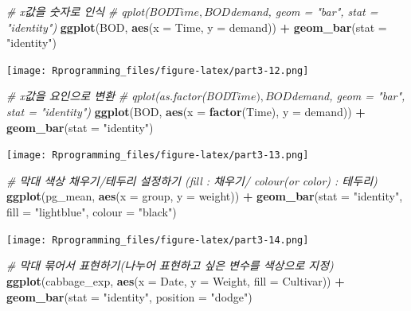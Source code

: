 \documentclass[10pt,]{krantz}
\makeatletter
\newenvironment{Shaded}{\begin{snugshade}}{\end{snugshade}}
\newcommand{\KeywordTok}[1]{\textcolor[rgb]{0.13,0.29,0.53}{\textbf{#1}}}
\newcommand{\DataTypeTok}[1]{\textcolor[rgb]{0.13,0.29,0.53}{#1}}
\newcommand{\StringTok}[1]{\textcolor[rgb]{0.31,0.60,0.02}{#1}}
\newcommand{\CommentTok}[1]{\textcolor[rgb]{0.56,0.35,0.01}{\textit{#1}}}
\newcommand{\OperatorTok}[1]{\textcolor[rgb]{0.81,0.36,0.00}{\textbf{#1}}}
\newcommand{\NormalTok}[1]{#1}
\newenvironment{kframe}{%
\medskip{}
\setlength{\fboxsep}{.8em}
 \def\at@end@of@kframe{}%
 \ifinner\ifhmode%
  \def\at@end@of@kframe{\end{minipage}}%
  \begin{minipage}{\columnwidth}%
 \fi\fi%
 \def\FrameCommand##1{\hskip\@totalleftmargin \hskip-\fboxsep
 \colorbox{shadecolor}{##1}\hskip-\fboxsep
     \hskip-\linewidth \hskip-\@totalleftmargin \hskip\columnwidth}%
 \MakeFramed {\advance\hsize-\width
   \@totalleftmargin\z@ \linewidth\hsize
   \@setminipage}}%
 {\par\unskip\endMakeFramed%
 \at@end@of@kframe}
\renewenvironment{Shaded}{\begin{kframe}}{\end{kframe}}
\theoremstyle{definition}
\theoremstyle{definition}
\theoremstyle{remark}
\makeatother
\begin{document}
\begin{Shaded}
\begin{Highlighting}[]


\CommentTok{# x값을 숫자로 인식}
\CommentTok{# qplot(BOD$Time, BOD$demand, geom = "bar", stat = "identity")}
\KeywordTok{ggplot}\NormalTok{(BOD, }\KeywordTok{aes}\NormalTok{(}\DataTypeTok{x =}\NormalTok{ Time, }\DataTypeTok{y =}\NormalTok{ demand)) }\OperatorTok{+}\StringTok{ }\KeywordTok{geom_bar}\NormalTok{(}\DataTypeTok{stat =} \StringTok{"identity"}\NormalTok{)}
\end{Highlighting}
\end{Shaded}

\texttt{[image: Rprogramming\_files/figure-latex/part3-12.png]}

\begin{Shaded}
\begin{Highlighting}[]


\CommentTok{# x값을 요인으로 변환}
\CommentTok{# qplot(as.factor(BOD$Time), BOD$demand, geom = "bar", stat = "identity")}
\KeywordTok{ggplot}\NormalTok{(BOD, }\KeywordTok{aes}\NormalTok{(}\DataTypeTok{x =} \KeywordTok{factor}\NormalTok{(Time), }\DataTypeTok{y =}\NormalTok{ demand)) }\OperatorTok{+}\StringTok{ }\KeywordTok{geom_bar}\NormalTok{(}\DataTypeTok{stat =} \StringTok{"identity"}\NormalTok{)}
\end{Highlighting}
\end{Shaded}

\texttt{[image: Rprogramming\_files/figure-latex/part3-13.png]}

\begin{Shaded}
\begin{Highlighting}[]


\CommentTok{# 막대 색상 채우기/테두리 설정하기 (fill : 채우기/ colour(or color) : 테두리)}
\KeywordTok{ggplot}\NormalTok{(pg_mean, }\KeywordTok{aes}\NormalTok{(}\DataTypeTok{x =}\NormalTok{ group, }\DataTypeTok{y =}\NormalTok{ weight)) }\OperatorTok{+}\StringTok{ }\KeywordTok{geom_bar}\NormalTok{(}\DataTypeTok{stat =} \StringTok{"identity"}\NormalTok{, }\DataTypeTok{fill =} \StringTok{"lightblue"}\NormalTok{, }\DataTypeTok{colour =} \StringTok{"black"}\NormalTok{)}
\end{Highlighting}
\end{Shaded}

\texttt{[image: Rprogramming\_files/figure-latex/part3-14.png]}

\begin{Shaded}
\begin{Highlighting}[]


\CommentTok{# 막대 묶어서 표현하기(나누어 표현하고 싶은 변수를 색상으로 지정)  }
\KeywordTok{ggplot}\NormalTok{(cabbage_exp, }\KeywordTok{aes}\NormalTok{(}\DataTypeTok{x =}\NormalTok{ Date, }\DataTypeTok{y =}\NormalTok{ Weight, }\DataTypeTok{fill =}\NormalTok{ Cultivar)) }\OperatorTok{+}\StringTok{ }\KeywordTok{geom_bar}\NormalTok{(}\DataTypeTok{stat =} \StringTok{"identity"}\NormalTok{, }\DataTypeTok{position =} \StringTok{"dodge"}\NormalTok{)}
\end{Highlighting}
\end{Shaded}
\end{document}
